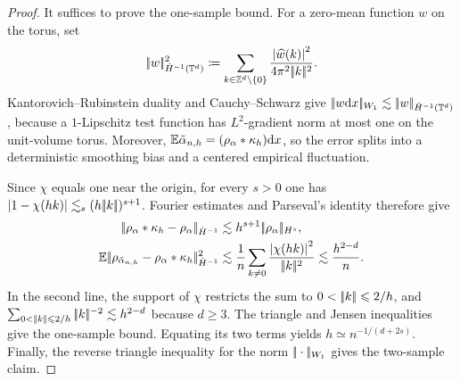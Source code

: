 \begin{proof}
	It suffices to prove the one-sample bound. For a zero-mean function \(w\) on the torus, set
	\[
		|\!| w |\!|_{\dot H^{-1}(\mathbb{T}^d)}^2
		\coloneqq
		\sum_{k\in\mathbb{Z}^d\setminus\{0\}}
		\frac{\left\lvert\widehat w(k)\right\rvert^2}{4\pi^2|\!| k |\!|^2}.
	\]
	Kantorovich--Rubinstein duality and Cauchy--Schwarz give \(|\!| w\mathrm{d} x |\!|_{W_1}\lesssim|\!| w |\!|_{\dot H^{-1}(\mathbb{T}^d)}\), because a \(1\)-Lipschitz test function has \(L^2\)-gradient norm at most one on the unit-volume torus. Moreover, \(\mathbb{E}\tilde\alpha_{n,h}=(\rho_{\alpha}\ast\kappa_h)\mathrm{d} x\), so the error splits into a deterministic smoothing bias and a centered empirical fluctuation.

	Since \(\chi\) equals one near the origin, for every \(s>0\) one has \(\left\lvert1-\chi(hk)\right\rvert\lesssim_s(h|\!| k |\!|)^{s+1}\). Fourier estimates and Parseval's identity therefore give
	\[
		\begin{aligned}
			\norm{\density{\alpha}\ast\kappa_h-\density{\alpha}}_{\dot H^{-1}}
			&\lesssim h^{s+1}\norm{\density{\alpha}}_{H^s},\\
			\EE\norm{\density{\tilde\alpha_{n,h}}-\density{\alpha}\ast\kappa_h}_{\dot H^{-1}}^2
			&\lesssim \frac1n\sum_{k\neq0}\frac{\abs{\chi(hk)}^2}{\norm{k}^2}
			\lesssim \frac{h^{2-d}}n.
		\end{aligned}
	\]
	In the second line, the support of \(\chi\) restricts the sum to \(0<\norm{k}\leq2/h\), and \(\sum_{0<\norm{k}\leq2/h}\norm{k}^{-2}\lesssim h^{2-d}\) because \(d\geq3\). The triangle and Jensen inequalities give the one-sample bound. Equating its two terms yields \(h\simeq n^{-1/(d+2s)}\). Finally, the reverse triangle inequality for the norm \(|\!| \cdot |\!|_{W_1}\) gives the two-sample claim.
\end{proof}

